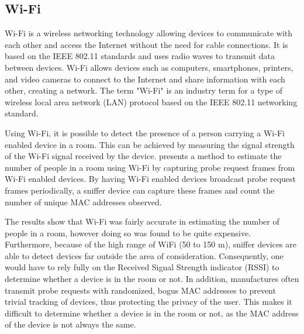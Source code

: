 \subsection{Wi-Fi} \label{sec:wi-fi}
Wi-Fi is a wireless networking technology allowing devices to communicate with each other and access the Internet without the need for cable connections.
It is based on the IEEE 802.11 standards and uses radio waves to transmit data between devices.
Wi-Fi allows devices such as computers, smartphones, printers, and video cameras to connect to the Internet and share information with each other, creating a network.
The term "Wi-Fi" is an industry term for a type of wireless local area network (LAN) protocol based on the IEEE 802.11 networking standard.\cite{WiFiAllianceDiscover,CiscoWhatIsWiFi}

Using Wi-Fi, it is possible to detect the presence of a person carrying a Wi-Fi enabled device in a room.
This can be achieved by measuring the signal strength of the Wi-Fi signal received by the device.
\citeauthor{longoAccurateOccupancyEstimation2019}\cite{longoAccurateOccupancyEstimation2019} presents a method to estimate the number of people in a room using Wi-Fi by capturing probe request frames from Wi-Fi enabled devices.
By having Wi-Fi enabled devices broadcast probe request frames periodically, a sniffer device can capture these frames and count the number of unique MAC addresses observed. \cite{longoAccurateOccupancyEstimation2019}

The results show that Wi-Fi was fairly accurate in estimating the number of people in a room, however doing so was found to be quite expensive.
Furthermore, because of the high range of WiFi (50 to 150 m), sniffer devices are able to detect devices far outside the area of consideration.
Consequently, one would have to rely fully on the Received Signal Strength indicator (RSSI) to determine whether a device is in the room or not.
In addition, manufactures often transmit probe requests with randomized, bogus MAC addresses to prevent trivial tracking of devices, thus protecting the privacy of the user.
This makes it difficult to determine whether a device is in the room or not, as the MAC address of the device is not always the same.\cite{longoAccurateOccupancyEstimation2019}